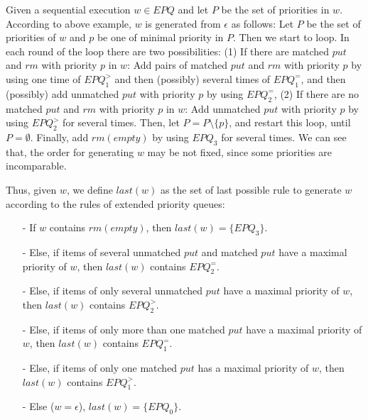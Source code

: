 Given a sequential execution $w \in \textit{EPQ}$ and let $P$ be the set of priorities in $w$. According to above example, $w$ is generated from $\epsilon$ as follows: Let $P$ be the set of priorities of $w$ and $p$ be one of minimal priority in $P$. Then we start to loop. In each round of the loop there are two possibilities: (1) If there are matched $\textit{put}$ and $\textit{rm}$ with priority $p$ in $w$: Add pairs of matched $\textit{put}$ and $\textit{rm}$ with priority $p$ by using one time of $\textit{EPQ}_1^{>}$ and then (possibly) several times of $\textit{EPQ}_1^{=}$, and then (possibly) add unmatched $\textit{put}$ with priority $p$ by using $\textit{EPQ}_2^{=}$, (2) If there are no matched $\textit{put}$ and $\textit{rm}$ with priority $p$ in $w$: Add unmatched $\textit{put}$ with priority $p$ by using $\textit{EPQ}_2^{>}$ for several times. Then, let $P = P \setminus \{ p \}$, and restart this loop, until $P = \emptyset$. Finally, add $\textit{rm}(\textit{empty})$ by using $\textit{EPQ}_3$ for several times. We can see that, the order for generating $w$ may be not fixed, since some priorities are incomparable.

Thus, given $w$, we define $\textit{last}(w)$ as the set of last possible rule to generate $w$ according to the rules of extended priority queues:

\begin{itemize}
\setlength{\itemsep}{0.5pt}
\item[-] If $w$ contains $\textit{rm}(\textit{empty})$, then $\textit{last}(w) = \{ \textit{EPQ}_3 \}$.

\item[-] Else, if items of several unmatched $\textit{put}$ and matched $\textit{put}$ have a maximal priority of $w$, then $\textit{last}(w)$ contains $\textit{EPQ}_2^{=}$.

\item[-] Else, if items of only several unmatched $\textit{put}$ have a maximal priority of $w$, then $\textit{last}(w)$ contains $\textit{EPQ}_2^{>}$.

\item[-] Else, if items of only more than one matched $\textit{put}$ have a maximal priority of $w$, then $\textit{last}(w)$ contains $\textit{EPQ}_1^{=}$.

\item[-] Else, if items of only one matched $\textit{put}$ has a maximal priority of $w$, then $\textit{last}(w)$ contains $\textit{EPQ}_1^{>}$.

\item[-] Else ($w = \epsilon$), $\textit{last}(w) = \{ \textit{EPQ}_0 \}$.
\end{itemize}

